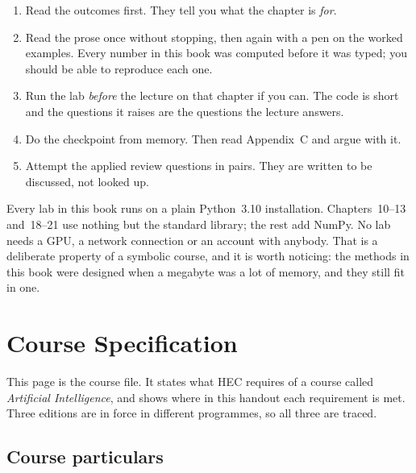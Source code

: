 \begin{enumerate}[leftmargin=2.2em, itemsep=3pt, topsep=4pt]
  \item Read the outcomes first. They tell you what the chapter is \emph{for}.
  \item Read the prose once without stopping, then again with a pen on the worked
        examples. Every number in this book was computed before it was typed; you
        should be able to reproduce each one.
  \item Run the lab \emph{before} the lecture on that chapter if you can. The code
        is short and the questions it raises are the questions the lecture answers.
  \item Do the checkpoint from memory. Then read Appendix~C and argue with it.
  \item Attempt the applied review questions in pairs. They are written to be
        discussed, not looked up.
\end{enumerate}

\begin{alertbox}
Every lab in this book runs on a plain Python~3.10 installation. Chapters~10--13
and~18--21 use nothing but the standard library; the rest add NumPy. No lab needs a
GPU, a network connection or an account with anybody. That is a deliberate
property of a symbolic course, and it is worth noticing: the methods in this book
were designed when a megabyte was a lot of memory, and they still fit in one.
\end{alertbox}

\newpage

\chapter*{Course Specification}

This page is the course file. It states what HEC requires of a course called
\emph{Artificial Intelligence}, and shows where in this handout each requirement
is met. Three editions are in force in different programmes, so all three are
traced.

\section*{Course particulars}

